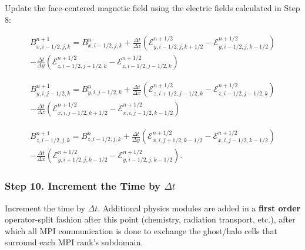 \documentclass[modern, linenumbers]{aastex631}
\begin{document}
Update the face-centered magnetic field using the electric fields calculated in Step 8:

\begin{equation}
    \begin{aligned}
        B^{n+1}_{x,i-1/2,j,k} = B^{n}_{x,i-1/2,j,k}
        + \frac{\Delta t}{\Delta z} \left( \mathcal{E}^{n+1/2}_{y,i-1/2,j,k+1/2} - \mathcal{E}^{n+1/2}_{y,i-1/2,j,k-1/2} \right) \\
        - \frac{\Delta t}{\Delta y} \left( \mathcal{E}^{n+1/2}_{z,i-1/2,j+1/2,k} - \mathcal{E}^{n+1/2}_{z,i-1/2,j-1/2,k} \right)
    \end{aligned}
\end{equation}

\begin{equation}
    \begin{aligned}
        B^{n+1}_{y,i,j-1/2,k} = B^{n}_{y,i,j-1/2,k}
        + \frac{\Delta t}{\Delta x} \left( \mathcal{E}^{n+1/2}_{z,i+1/2,j-1/2,k} - \mathcal{E}^{n+1/2}_{z,i-1/2,j-1/2,k} \right) \\
        - \frac{\Delta t}{\Delta z} \left( \mathcal{E}^{n+1/2}_{x,i,j-1/2,k+1/2} - \mathcal{E}^{n+1/2}_{x,i,j-1/2,k-1/2} \right)
    \end{aligned}
\end{equation}

\begin{equation}
    \begin{aligned}
        B^{n+1}_{z,i-1/2,j,k} = B^{n}_{z,i-1/2,j,k}
        + \frac{\Delta t}{\Delta y} \left( \mathcal{E}^{n+1/2}_{x,i,j+1/2,k-1/2} - \mathcal{E}^{n+1/2}_{x,i,j-1/2,k-1/2} \right) \\
        - \frac{\Delta t}{\Delta x} \left( \mathcal{E}^{n+1/2}_{y,i+1/2,j,k-1/2} - \mathcal{E}^{n+1/2}_{y,i-1/2,j,k-1/2} \right).
    \end{aligned}
\end{equation}

\subsubsection{Step 10. Increment the Time by \texorpdfstring{$\Delta t$}{dt}}
\label{vlct:increment-time}

Increment the time by $\Delta t$. Additional physics modules are added in a \textbf{first order} operator-split fashion after this point (chemistry, radiation transport, etc.), after which all MPI communication is done to exchange the ghost/halo cells that surround each MPI rank's subdomain.
\end{document}
